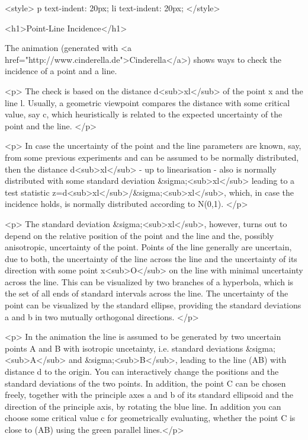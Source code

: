 <style>
p {
  text-indent: 20px;
}
li {
  text-indent: 20px;
}
</style>

<h1>Point-Line Incidence</h1> 


The  animation (generated with  <a href="http://www.cinderella.de">Cinderella</a>) shows ways to check the incidence of a point and a line.
    
<p> The check is based on the distance d<sub>xl</sub> of the point x and the line l. Usually, a geometric viewpoint compares the distance with some critical value, say c, which heuristically is related to the expected uncertainty of the point and the line. </p>

<p> In case the uncertainty of the point and the line parameters are known, say, from some previous experiments and can be assumed to be normally distributed, then the distance d<sub>xl</sub> - up to linearisation - also is normally distributed with some standard deviation &sigma;<sub>xl</sub> leading to a test statistic z=d<sub>xl</sub>/&sigma;<sub>xl</sub>, which, in case the incidence holds, is normally distributed according to N(0,1).
</p>

<p> The standard deviation &sigma;<sub>xl</sub>, however, turns out to depend on the relative position of the point and the line and the, possibly anisotropic, uncertainty of the point. Points of the line generally are uncertain, due to both, the uncertainty of the line across the line and the uncertainty of its direction with some point x<sub>O</sub> on the line with minimal uncertainty across the line. This can be visualized by two branches of a hyperbola, which is the set of all ends of standard intervals across the line. The uncertainty of the point can be visualized by the standard ellipse, providing the standard deviations a and b in two mutually orthogonal directions.  </p>

<p> In the animation the line is assumed to be generated by two uncertain points A and B with isotropic uncetainty, i.e. standard deviations &sigma;<sub>A</sub> and &sigma;<sub>B</sub>, leading to the line (AB) with distance d to the origin. You can interactively change the positions and the standard deviations of the two points. In addition, the point C can be chosen freely, together with the principle axes a and b of its standard ellipsoid and the direction of the principle axis, by rotating the blue line. In addition you can choose some critical value c for geometrically evaluating, whether the point C is close to (AB) using the green parallel lines.</p> 

